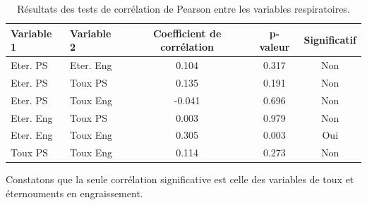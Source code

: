 \documentclass{article}
\begin{document}
\begin{table}[ht]
    \centering
    \begin{tabular}{llccc}
    \toprule
    \textbf{Variable 1} & \textbf{Variable 2} & \textbf{Coefficient de corrélation} & \textbf{p-valeur} & \textbf{Significatif} \\
    \midrule
    Eter. PS & Eter. Eng & 0.104 & 0.317 & Non \\
    Eter. PS & Toux PS & 0.135 & 0.191 & Non \\
    Eter. PS & Toux Eng & -0.041 & 0.696 & Non \\
    Eter. Eng & Toux PS & 0.003 & 0.979 & Non \\
    Eter. Eng & Toux Eng & 0.305 & 0.003 & Oui \\
    Toux PS & Toux Eng & 0.114 & 0.273 & Non \\
    \bottomrule
    \end{tabular}
    \caption{Résultats des tests de corrélation de Pearson entre les variables respiratoires.}\label{tab:correlation_results}
\end{table}
Constatons que la seule corrélation significative est celle des variables de toux et éternouments en engraissement. 
\end{document}
